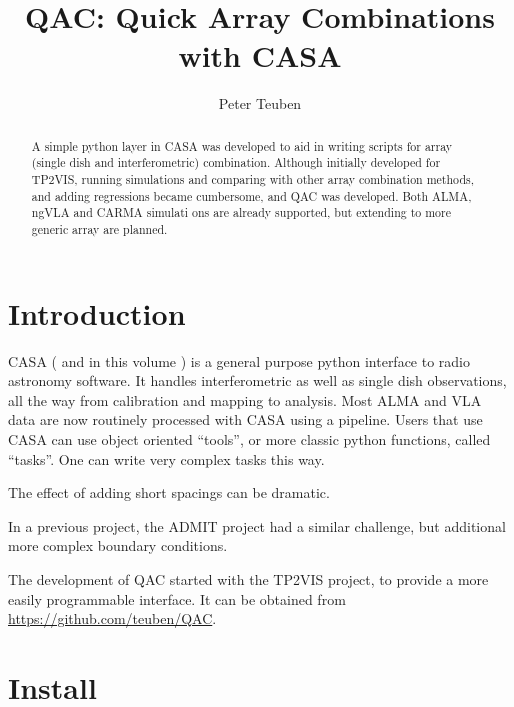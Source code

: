 \documentclass[11pt,twoside]{article}
\begin{document}
\title{QAC: Quick Array Combinations with CASA}
\author{Peter Teuben
  }



\begin{abstract}

A simple python layer in CASA was developed to aid in writing scripts
for array (single dish and interferometric) combination. Although
initially developed for TP2VIS, running simulations and comparing
with other array combination methods, and adding regressions became
cumbersome, and QAC was developed. Both ALMA, ngVLA and CARMA simulati
ons are already supported, but extending to more generic array are
planned.

\end{abstract}




\section{Introduction}

CASA (\citet{casa1} and in this volume \citet{casa2}) 
is a general purpose python interface to radio
astronomy software. It handles interferometric as well as single dish
observations, all the way from calibration and mapping to
analysis. Most ALMA and VLA data are now routinely processed with CASA
using a pipeline.  Users that use CASA can use object oriented
``tools'', or more classic python functions, called
``tasks''. One can write very complex tasks this way.

The effect of adding short spacings can be dramatic.

In a previous project, the ADMIT project had a similar challenge, but
additional more complex boundary conditions.

The development of QAC started with the TP2VIS project, to provide a
more easily programmable interface. It can be obtained from
\url{https://github.com/teuben/QAC}.

\section{Install}
\end{document}

